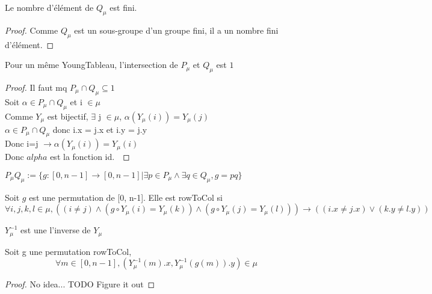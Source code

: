 \begin{definition}[QuCard]
    \label{QuCard}
    \leanok
    Le nombre d'élément de $Q_{\mu}$ est fini.
\end{definition}
\begin{proof}
    \leanok
    Comme $Q_{\mu}$ est un sous-groupe d'un groupe fini, il a un nombre fini d'élément.
\end{proof}

\begin{lemma}[sectPuQu]
    \label{sectPuQu}
    \leanok
    Pour un même YoungTableau, l'intersection de $P_{\mu}$ et $Q_{\mu}$ est ${1}$
\end{lemma}
\begin{proof}
    \leanok
    Il faut mq $P_{\mu} \cap Q_{\mu} \subseteq {1}$\\
    Soit $\alpha \in P_{\mu} \cap Q_{\mu}$ et i $\in \mu$\\
    Comme $Y_{\mu}$ est bijectif, $\exists$ j $\in \mu$, $\alpha ( Y_{\mu} (i)) = Y_{\mu} (j)$\\
    $\alpha \in P_{\mu} \cap Q_{\mu}$ donc i.x = j.x et i.y = j.y\\
    Donc i=j $\to \alpha(Y_{\mu}(i))=Y_{\mu}(i)$\\
    Donc $alpha$ est la fonction id.\
\end{proof}

\begin{definition}[PuQu]
    \label{PuQu}
    \leanok
    $P_{\mu}Q_{\mu} := \{g : [0,n-1] \to [0,n-1] | \exists p \in P_{\mu} \land \exists q \in Q_{\mu}, g = p q \}$
\end{definition}

\begin{definition}[rowToCol]
    \label{rowToCol}
    \leanok
    Soit $g$ est une permutation de [0, n-1]. Elle est rowToCol si
    \[ \forall i,j,k,l \in \mu, ((i \neq j) \land (g \circ Y_{\mu} (i) = Y_{\mu} (k)) \land (g \circ Y_{\mu} (j) = Y_{\mu} (l))) → ((i.x \neq j.x) \lor (k.y \neq l.y)) \]
\end{definition}

\begin{definition}[YuInv]
    \label{YuInv}
    \leanok
    $Y_{\mu}^{-1}$ est une l'inverse de $Y_{\mu}$
\end{definition}

\begin{lemma}[staysInY]
    \label{staysInY}
    \leanok
    Soit g une permutation rowToCol,
    \[ \forall m \in [0,n-1], (Y_{\mu}^{-1}(m).x,Y_{\mu}^{-1}(g(m)).y) \in \mu \]
\end{lemma}
\begin{proof}
    No idea...
    TODO Figure it out
\end{proof}

